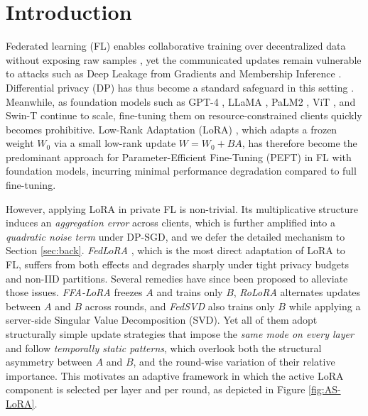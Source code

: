 \vspace{-3mm}

\section{Introduction} 
Federated learning (FL) enables collaborative training over decentralized data without exposing raw samples \cite{mcmahan2017communication, bonawitz2019towards}, yet the communicated updates remain vulnerable to attacks such as Deep Leakage from Gradients \cite{zhu2019deep} and Membership Inference \cite{shokri2017membership}. Differential privacy (DP) has thus become a standard safeguard in this setting \cite{zheng2021federated, naseri2020local}. Meanwhile, as foundation models such as GPT-4 \cite{achiam2023gpt}, LLaMA \cite{touvron2023llama}, PaLM2 \cite{anil2023palm}, ViT \cite{dosovitskiy2020image}, and Swin-T \cite{liu2021swin} continue to scale, fine-tuning them on resource-constrained clients quickly becomes prohibitive. Low-Rank Adaptation (LoRA) \cite{hu2022lora}, which adapts a frozen weight $W_0$ via a small low-rank update $W=W_0 +BA$, has therefore become the predominant approach for Parameter-Efficient Fine-Tuning (PEFT) in FL with foundation models, incurring minimal performance degradation compared to full fine-tuning.



However, applying LoRA in private FL is non-trivial. Its multiplicative structure induces an \emph{aggregation error} across clients, which is further amplified into a \emph{quadratic noise term} under DP-SGD, and we defer the detailed mechanism to Section \ref{sec:back}. \emph{FedLoRA} \cite{zhang2024towards}, which is the most direct adaptation of LoRA to FL, suffers from both effects and degrades sharply under tight privacy budgets and non-IID partitions. Several remedies have since been proposed to alleviate those issues. \emph{FFA-LoRA} \cite{sun2024improving} freezes $A$ and trains only $B$, \emph{RoLoRA} \cite{chen2025robust} alternates updates between $A$ and $B$ across rounds, and \emph{FedSVD} \cite{lee2025fedsvd} also trains only $B$ while applying a server-side Singular Value Decomposition (SVD). Yet all of them adopt structurally simple update strategies that impose the \emph{same mode on every layer} and follow \emph{temporally static patterns}, which overlook both the structural asymmetry between $A$ and $B$, and the round-wise variation of their relative importance. This motivates an adaptive framework in which the active LoRA component is selected per layer and per round, as depicted in Figure \ref{fig:AS-LoRA}. 



